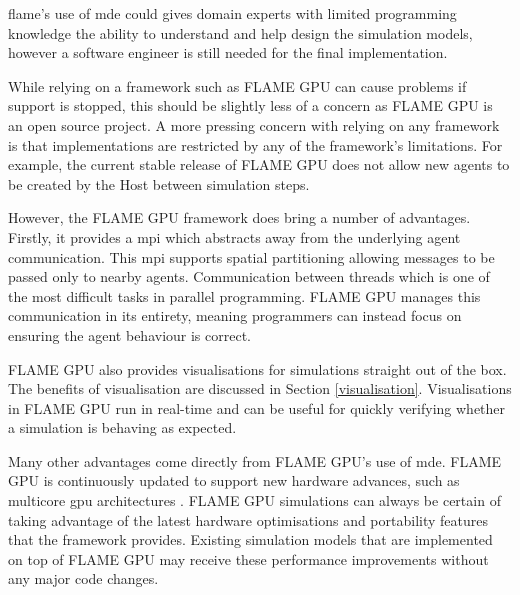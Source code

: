 \documentclass{UoYCSproject}
\begin{document}
\gls{flame}'s use of \gls{mde} could gives domain experts with limited programming knowledge the ability to understand and help design the simulation models, however a software engineer is still needed for the final implementation.



While relying on a framework such as \gls{FLAME GPU} can cause problems if support is stopped, this should be slightly less of a concern as \gls{FLAME GPU} is an open source project.
A more pressing concern with relying on any framework is that implementations are restricted by any of the framework's limitations.
For example, the current stable release of \gls{FLAME GPU} does not allow new agents to be created by the \gls{Host} between simulation steps.

However, the \gls{FLAME GPU} framework does bring a number of advantages.
Firstly, it provides a \gls{mpi} which abstracts away from the underlying agent communication.
This \gls{mpi} supports spatial partitioning allowing messages to be passed only to nearby agents.
Communication between threads which is one of the most difficult tasks in parallel programming.
\gls{FLAME GPU} manages this communication in its entirety, meaning programmers can instead focus on ensuring the agent behaviour is correct.

\gls{FLAME GPU} also provides visualisations for simulations straight out of the box.
The benefits of visualisation are discussed in Section \ref{visualisation}.
Visualisations in \gls{FLAME GPU} run in real-time and can be useful for quickly verifying whether a simulation is behaving as expected.

Many other advantages come directly from \gls{FLAME GPU}'s use of \gls{mde}.
\gls{FLAME GPU} is continuously updated to support new hardware advances, such as multicore \acrshort{gpu} architectures \cite{flame_simulation}.
\gls{FLAME GPU} simulations can always be certain of taking advantage of the latest hardware optimisations and portability features that the framework provides.
Existing simulation models that are implemented on top of \gls{FLAME GPU} may receive these performance improvements without any major code changes.
\end{document}
